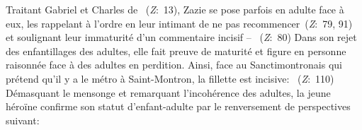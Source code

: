 Traitant Gabriel et Charles de ~(\textit{Z}:~13), Zazie se pose parfois en adulte face à eux, les rappelant à l'ordre en leur intimant de ne pas recommencer~(\textit{Z}:~79, 91) et soulignant leur immaturité d'un commentaire incisif -- ~(\textit{Z}:~80)
Dans son rejet des enfantillages des adultes, elle fait preuve de maturité et figure en personne raisonnée face à des adultes en perdition.
Ainsi, face au Sanctimontronais qui prétend qu'il y a le métro à Saint-Montron, la fillette est incisive: ~(\textit{Z}:~110)
Démasquant le mensonge et remarquant l'incohérence des adultes, la jeune héroïne confirme son statut d'enfant-adulte par le renversement de perspectives suivant: 

